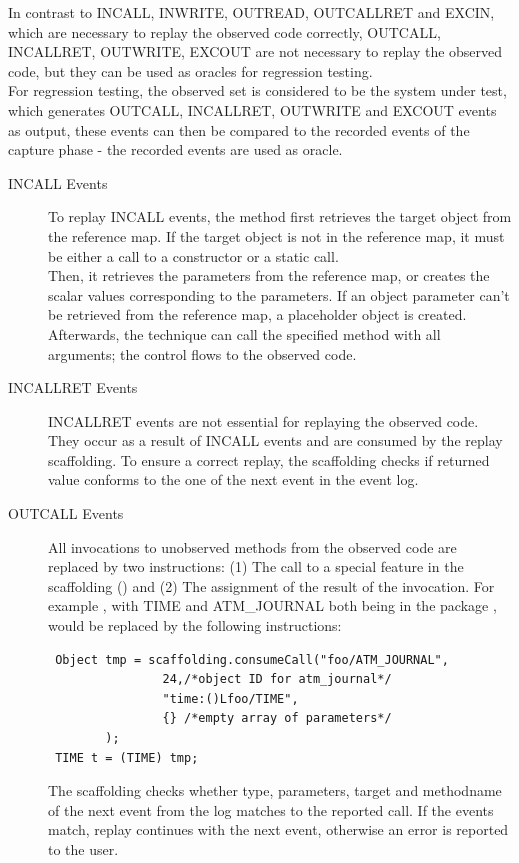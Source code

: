 In contrast to INCALL, INWRITE, OUTREAD, OUTCALLRET and EXCIN, which are necessary to replay the observed code correctly, OUTCALL, INCALLRET, OUTWRITE, EXCOUT are not necessary to replay the observed code, but they can be used as oracles for regression testing. \\
For regression testing, the observed set is considered to be the system under test, which generates OUTCALL, INCALLRET, OUTWRITE and EXCOUT events as output, these events can then be compared to the recorded events of the capture phase - the recorded events are used as oracle.

\begin{description}
 \item [INCALL Events] To replay INCALL events, the method first retrieves the target object from the reference map. If the target object is not in the reference map, it must be either a call to a constructor or a static call.\\
Then, it retrieves the parameters from the reference map, or creates the scalar values corresponding to the parameters. If an object parameter can't be retrieved from the reference map, a placeholder object is created. Afterwards, the technique can call the specified method with all arguments; the control flows to the observed code. 
 \item [INCALLRET Events] INCALLRET events are not essential for replaying the observed code. They occur as a result of INCALL events and are consumed by the replay scaffolding. To ensure a correct replay, the scaffolding checks if returned value conforms to the one of the next event in the event log.
 \item [OUTCALL Events] All invocations to unobserved methods from the observed code are replaced by two instructions: (1) The call to a special feature in the scaffolding () and (2) The assignment of the result of the invocation. For example , with TIME and ATM\_JOURNAL both being in the package , would be replaced by the following instructions:
\begin{lstlisting}
 Object tmp = scaffolding.consumeCall("foo/ATM_JOURNAL",
                24,/*object ID for atm_journal*/
                "time:()Lfoo/TIME",
                {} /*empty array of parameters*/
		);
 TIME t = (TIME) tmp;
\end{lstlisting}
The scaffolding checks whether type, parameters, target and methodname of the next event from the log matches to the reported call. If the events match, replay continues with the next event, otherwise an error is reported to the user.

\end{description}
